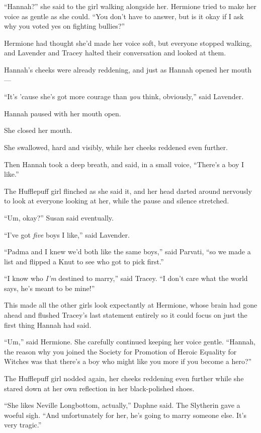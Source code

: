 “Hannah?” she said to the girl walking alongside her. Hermione tried to make her voice as gentle as she could. “You don’t have to answer, but is it okay if I ask why you voted yes on fighting bullies?”

Hermione had thought she’d made her voice soft, but everyone stopped walking, and Lavender and Tracey halted their conversation and looked at them.

Hannah’s cheeks were already reddening, and just as Hannah opened her mouth—

“It’s ’cause she’s got more courage than \emph{you} think, obviously,” said Lavender.

Hannah paused with her mouth open.

She closed her mouth.

She swallowed, hard and visibly, while her cheeks reddened even further.

Then Hannah took a deep breath, and said, in a small voice, “There’s a boy I like.”

The Hufflepuff girl flinched as she said it, and her head darted around nervously to look at everyone looking at her, while the pause and silence stretched.

“Um, okay?” Susan said eventually.

“I’ve got \emph{five} boys I like,” said Lavender.

“Padma and I knew we’d both like the same boys,” said Parvati, “so we made a list and flipped a Knut to see who got to pick first.”

“I know who \emph{I’m} destined to marry,” said Tracey. “I don’t care what the world says, he’s meant to be mine!”

This made all the other girls look expectantly at Hermione, whose brain had gone ahead and flushed Tracey’s last statement entirely so it could focus on just the first thing Hannah had said.

“Um,” said Hermione. She carefully continued keeping her voice gentle. “Hannah, the reason why you joined the Society for Promotion of Heroic Equality for Witches was that there’s a boy who might like you more if you become a hero?”

The Hufflepuff girl nodded again, her cheeks reddening even further while she stared down at her own reflection in her black-polished shoes.

“She likes Neville Longbottom, actually,” Daphne said. The Slytherin gave a woeful sigh. “And unfortunately for her, he’s going to marry someone else. It’s very tragic.”

